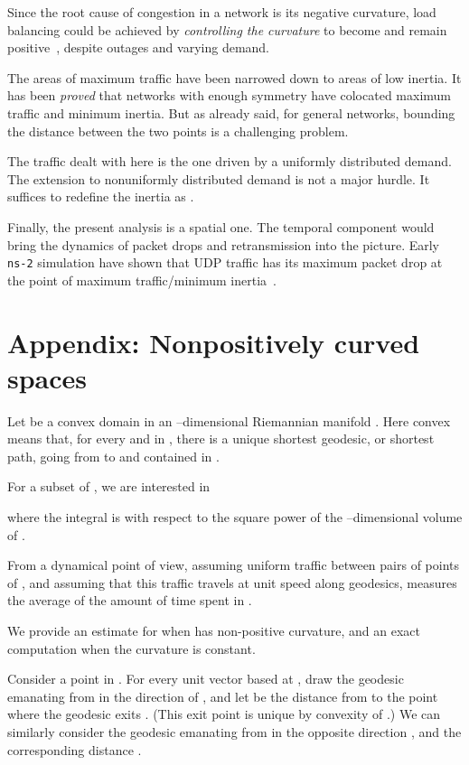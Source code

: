 \documentclass{article}
\begin{document}
Since the root cause of congestion in a network is its negative curvature, load balancing could be achieved 
by {\it controlling the curvature} to become and remain positive~\cite{mingjithesis}, despite outages 
and varying demand. 

The areas of maximum traffic have been narrowed down to areas of low inertia.  
It has been {\it proved} that networks with enough symmetry  
have colocated maximum traffic and minimum inertia. 
But as already said, for general networks, bounding the distance between the two points is a challenging problem. 

The traffic dealt with here is the one driven by a uniformly distributed demand. 
The extension to nonuniformly distributed demand is not a major hurdle. 
It suffices to redefine the inertia as . 

Finally, the present analysis is a spatial one. 
The temporal component would bring the dynamics of packet drops and retransmission into the picture. 
Early {\tt ns-2} simulation have shown that UDP traffic has its  
maximum packet drop at the point of maximum traffic/minimum inertia~\cite{mingjithesis}. 



\noindent 

\noindent 
\section{Appendix: Nonpositively curved spaces}
\label{s:app}

Let  be a convex domain in 
an --dimensional Riemannian manifold . Here convex means that, for every  and  in , 
there is a unique shortest geodesic, or shortest path,  going from  to  and contained in . 

For a subset  of , we are interested in

where the integral is with respect to the square power of the --dimensional volume of . 

From a dynamical point of view, assuming uniform traffic between pairs of points of , 
and assuming that this traffic travels at unit speed along geodesics, 
 measures the average of the amount of time spent in . 

We provide an estimate for  when  has non-positive curvature, 
and an exact computation when the curvature is constant. 

Consider a point  in .
For every unit vector  based at ,  
draw the geodesic  emanating from  in the direction of , 
and let  be the distance from  to the point  where the geodesic exits . 
(This exit point is unique by convexity of .) 
We can similarly consider the geodesic  emanating from  in the opposite direction , 
and the corresponding distance .
\end{document}
